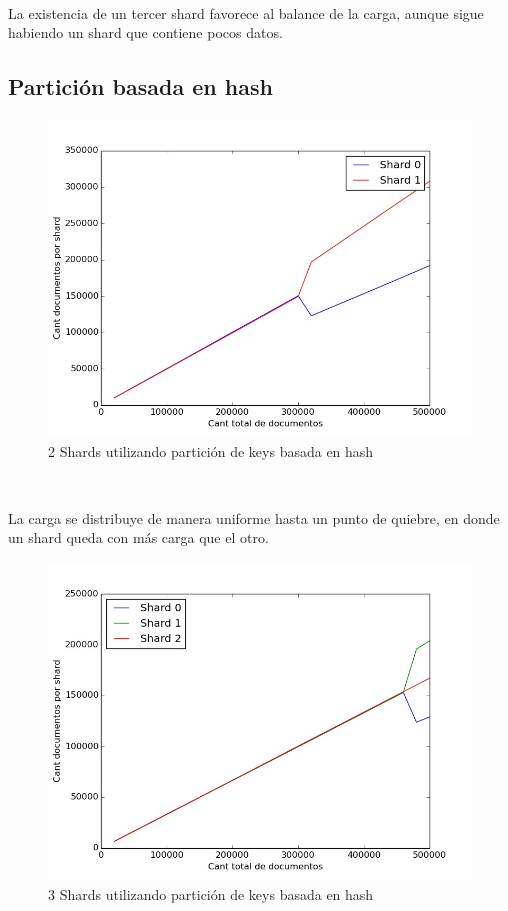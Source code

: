 ~

La existencia de un tercer shard favorece al balance de la carga, aunque sigue habiendo un shard que contiene
pocos datos.

\subsection{Partición basada en hash}

\begin{figure}[!h]
  \begin{center}
      \includegraphics[scale=0.4]{imagenes/hash1.jpg}
      \caption{2 Shards utilizando partición de keys basada en hash}
      \label{fig:contra1}
  \end{center}
\end{figure}

~

La carga se distribuye de manera uniforme hasta un punto de quiebre, en donde un shard queda con más carga que
el otro.

\begin{figure}[!h]
  \begin{center}
      \includegraphics[scale=0.4]{imagenes/hash2.jpg}
      \caption{3 Shards utilizando partición de keys basada en hash}
      \label{fig:contra1}
  \end{center}
\end{figure}

